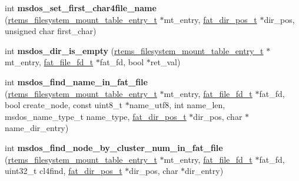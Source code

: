 \begin{DoxyCompactItemize}
\item 
\mbox{\label{group__libfs__msdos_gaa74c45d3431bbe097a3560181bddb318}} 
int {\bfseries msdos\+\_\+set\+\_\+first\+\_\+char4file\+\_\+name} (\mbox{\hyperlink{structrtems__filesystem__mount__table__entry__tt}{rtems\+\_\+filesystem\+\_\+mount\+\_\+table\+\_\+entry\+\_\+t}} $\ast$mt\+\_\+entry, \mbox{\hyperlink{structfat__dir__pos__s}{fat\+\_\+dir\+\_\+pos\+\_\+t}} $\ast$dir\+\_\+pos, unsigned char first\+\_\+char)
\item 
\mbox{\label{group__libfs__msdos_gac3dc46157fcd31ec27896a893ee98222}} 
int {\bfseries msdos\+\_\+dir\+\_\+is\+\_\+empty} (\mbox{\hyperlink{structrtems__filesystem__mount__table__entry__tt}{rtems\+\_\+filesystem\+\_\+mount\+\_\+table\+\_\+entry\+\_\+t}} $\ast$mt\+\_\+entry, \mbox{\hyperlink{group__libfs__ff_gaa53f9c544914509505e3cfbd3796f877}{fat\+\_\+file\+\_\+fd\+\_\+t}} $\ast$fat\+\_\+fd, bool $\ast$ret\+\_\+val)
\item 
\mbox{\label{group__libfs__msdos_ga34551eb61dc32e03c04dbe73b875bbbc}} 
int {\bfseries msdos\+\_\+find\+\_\+name\+\_\+in\+\_\+fat\+\_\+file} (\mbox{\hyperlink{structrtems__filesystem__mount__table__entry__tt}{rtems\+\_\+filesystem\+\_\+mount\+\_\+table\+\_\+entry\+\_\+t}} $\ast$mt\+\_\+entry, \mbox{\hyperlink{group__libfs__ff_gaa53f9c544914509505e3cfbd3796f877}{fat\+\_\+file\+\_\+fd\+\_\+t}} $\ast$fat\+\_\+fd, bool create\+\_\+node, const uint8\+\_\+t $\ast$name\+\_\+utf8, int name\+\_\+len, msdos\+\_\+name\+\_\+type\+\_\+t name\+\_\+type, \mbox{\hyperlink{structfat__dir__pos__s}{fat\+\_\+dir\+\_\+pos\+\_\+t}} $\ast$dir\+\_\+pos, char $\ast$name\+\_\+dir\+\_\+entry)
\item 
\mbox{\label{group__libfs__msdos_ga5dbde8f9c4e825bf5b3c37de4ffd271d}} 
int {\bfseries msdos\+\_\+find\+\_\+node\+\_\+by\+\_\+cluster\+\_\+num\+\_\+in\+\_\+fat\+\_\+file} (\mbox{\hyperlink{structrtems__filesystem__mount__table__entry__tt}{rtems\+\_\+filesystem\+\_\+mount\+\_\+table\+\_\+entry\+\_\+t}} $\ast$mt\+\_\+entry, \mbox{\hyperlink{group__libfs__ff_gaa53f9c544914509505e3cfbd3796f877}{fat\+\_\+file\+\_\+fd\+\_\+t}} $\ast$fat\+\_\+fd, uint32\+\_\+t cl4find, \mbox{\hyperlink{structfat__dir__pos__s}{fat\+\_\+dir\+\_\+pos\+\_\+t}} $\ast$dir\+\_\+pos, char $\ast$dir\+\_\+entry)
\item 
\mbox{\label{group__libfs__msdos_ga78e4da8e660c1055805ddc0b8349520f}} 

\end{DoxyCompactItemize}
